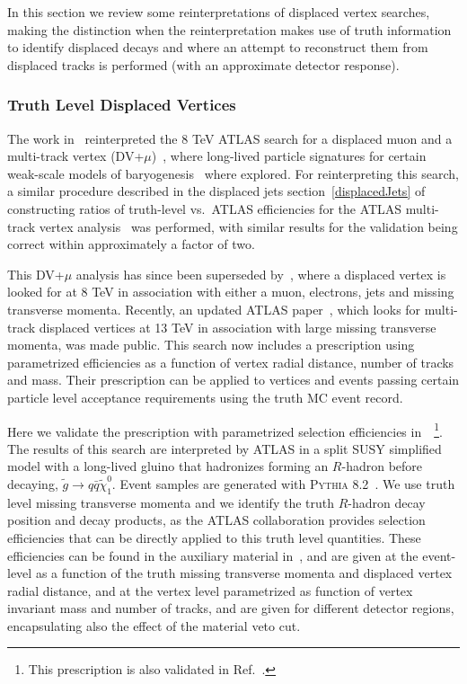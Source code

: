 In this section we review some reinterpretations of displaced vertex searches, making the distinction when the reinterpretation makes use of truth information to identify displaced decays and where an attempt to reconstruct them from displaced tracks is performed (with an approximate detector response).

\subsubsection{Truth Level Displaced Vertices}

The work in~\cite{Cui:2014twa} reinterpreted the 8 TeV ATLAS search for a displaced muon and a multi-track vertex (DV+$\mu$)~\cite{ATLAS-CONF-2013-092}, where long-lived particle signatures for certain weak-scale models of baryogenesis~\cite{Cui:2012jh,Cui:2013bta,Cui:2014twa} where explored. For reinterpreting this search, a similar procedure described in the displaced jets 
section~\ref{displacedJets} of constructing ratios of truth-level vs.~ATLAS efficiencies for the ATLAS multi-track vertex analysis~\cite{ATLAS-CONF-2013-092} was performed, with similar results for the validation being correct within approximately a factor of two. 

This DV+$\mu$ analysis has since been superseded by~\cite{Aad:2015rba}, where a displaced vertex is looked for at 8 TeV in association with either a muon, electrons, jets and missing transverse momenta. Recently, an updated ATLAS paper~\cite{Aaboud:2017iio}, which looks for multi-track displaced vertices at 13 TeV in association with large missing transverse momenta, was made public. This search now includes a prescription using parametrized efficiencies as a function of vertex radial distance, number of tracks and mass. Their prescription can be applied to vertices and events passing certain particle level acceptance requirements using the truth MC event record. 

Here we validate the prescription with parametrized selection efficiencies
in~\cite{Aaboud:2017iio}~\footnote{This prescription is also validated in
Ref.~\cite{LesHouches2017}.}. The results of this search are interpreted by ATLAS in a split SUSY simplified model with a long-lived gluino that hadronizes forming an $R$-hadron before decaying, $\tilde{g}\rightarrow q\bar{q}\tilde{\chi}^{0}_{1}$. Event samples are generated with \textsc{Pythia 8.2}~\cite{Sjostrand:2014zea}. We use truth level missing transverse momenta and we identify the truth $R$-hadron decay position and decay products, as the ATLAS collaboration provides selection efficiencies that can be directly applied to this truth level quantities. These efficiencies can be found in the auxiliary material in~\cite{SUSY-2016-08}, and are given at the event-level as a function of the truth missing transverse momenta and displaced vertex radial distance, and at the vertex level parametrized as function of vertex invariant mass and number of tracks, and are given for different detector regions, encapsulating also the effect of the material veto cut.

